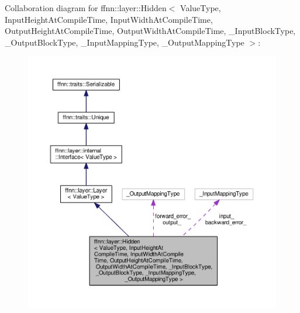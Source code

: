 Collaboration diagram for ffnn\-:\-:layer\-:\-:Hidden$<$ Value\-Type, Input\-Height\-At\-Compile\-Time, Input\-Width\-At\-Compile\-Time, Output\-Height\-At\-Compile\-Time, Output\-Width\-At\-Compile\-Time, \-\_\-\-Input\-Block\-Type, \-\_\-\-Output\-Block\-Type, \-\_\-\-Input\-Mapping\-Type, \-\_\-\-Output\-Mapping\-Type $>$\-:
\nopagebreak
\begin{figure}[H]
\begin{center}
\leavevmode
\includegraphics[width=350pt]{classffnn_1_1layer_1_1_hidden__coll__graph}
\end{center}
\end{figure}
